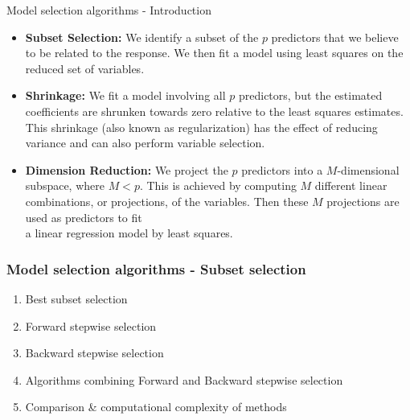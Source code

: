 \documentclass{beamer}
\begin{document}
\begin{frame}{Model selection algorithms - Introduction}
\begin{itemize}
\item \textbf{Subset Selection:} We identify a subset of the $p$ predictors
that we believe to be related to the response. We then fit a
model using least squares on the reduced set of variables.
\medskip
\item \textbf{Shrinkage:} We fit a model involving all $p$ predictors, but
the estimated coefficients are shrunken towards zero
relative to the least squares estimates. This shrinkage (also
known as regularization) has the effect of reducing variance
and can also perform variable selection.
\medskip
\item \textbf{Dimension Reduction:} We project the $p$ predictors into a
$M$-dimensional subspace, where $M < p$. This is achieved by
computing $M$ different linear combinations, or projections,
of the variables. Then these $M$ projections are used as
predictors to fit \\a linear regression model by least squares.

\end{itemize}

\end{frame}
\begin{frame}
\frametitle{Model selection algorithms - Subset selection}

\begin{enumerate}
  \item Best subset selection
  \medskip
  \item Forward stepwise selection
  \medskip
  \item Backward stepwise selection
  \medskip
  \item Algorithms combining Forward and Backward stepwise selection\\
  \medskip
  \item Comparison \& computational complexity of methods
\end{enumerate}


\end{frame}

\end{document}
